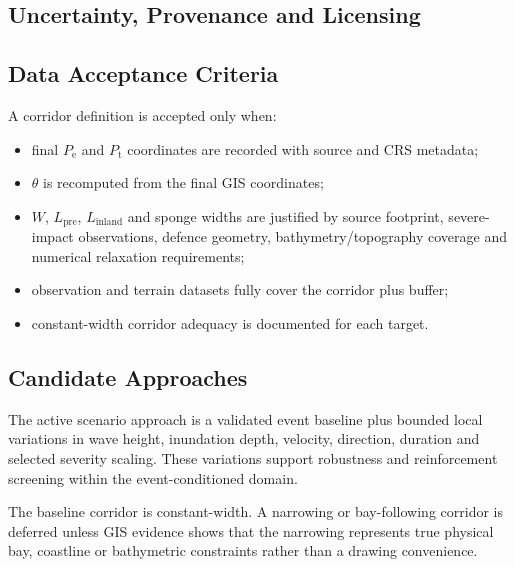 
\subsection{Uncertainty, Provenance and Licensing}
\label{sec:res-dat-scn-uncertainty-provenance-licensing}


\subsection{Data Acceptance Criteria}
\label{sec:res-dat-scn-data-acceptance-criteria}

A corridor definition is accepted only when:

\begin{itemize}
  \item final $P_{\mathrm{e}}$ and $P_{\mathrm{t}}$ coordinates are
    recorded with source and CRS metadata;
  \item $\theta$ is recomputed from the final GIS coordinates;
  \item $W$, $L_{\mathrm{pre}}$, $L_{\mathrm{inland}}$ and sponge
    widths are justified by source footprint, severe-impact
    observations, defence geometry, bathymetry/topography coverage and
    numerical relaxation requirements;
  \item observation and terrain datasets fully cover the corridor plus
    buffer;
  \item constant-width corridor adequacy is documented for each target.
\end{itemize}

\subsection{Candidate Approaches}
\label{sec:res-dat-scn-candidate-approaches}

The active scenario approach is a validated event baseline plus bounded local
variations in wave height, inundation depth, velocity, direction, duration and
selected severity scaling. These variations support robustness and
reinforcement screening within the event-conditioned domain.

The baseline corridor is constant-width. A narrowing or bay-following
corridor is deferred unless GIS evidence shows that the narrowing
represents true physical bay, coastline or bathymetric constraints
rather than a drawing convenience.

